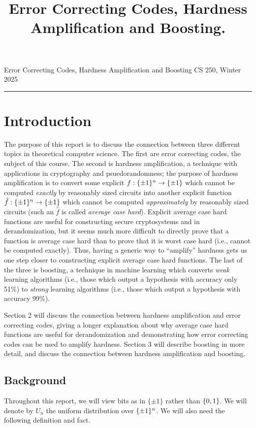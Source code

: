 \documentclass[11pt]{article}
\title{Error Correcting Codes, Hardness Amplification and Boosting.}
\date{}
\begin{document}
    
\noindent Error Correcting Codes, Hardness Amplification and Boosting \hfill  CS 250, Winter 2025\\
\hrule


\section{Introduction}

The purpose of this report is to discuss the connection between three different topics in theoretical computer science. The first are error correcting codes, the subject of this course. The second is hardness amplification, a technique with applications in cryptography and psuedorandomness; the purpose of hardness amplification is to convert some explicit $f : \{\pm 1\}^n \rightarrow \{\pm 1\}$ which cannot be computed \emph{exactly} by reasonably sized circuits into another explicit function $\hat{f} : \{\pm 1\}^n \rightarrow \{\pm 1\}$ which cannot be computed \emph{approximately} by reasonably sized circuits (such an $\hat{f}$ is called \emph{average case hard}). Explicit average case hard functions are useful for constructing secure cryptosystems and in derandomization, but it seems much more difficult to directly prove that a function is average case hard than to prove that it is worst case hard (i.e., cannot be computed exactly). Thus, having a generic way to ``amplify'' hardness gets us one step closer to constructing explicit average case hard functions. The last of the three is boosting, a technique in machine learning which converts \emph{weak} learning algorithms (i.e., those which output a hypothesis with accuracy only 51\%) to \emph{strong} learning algorithms (i.e., those which output a hypothesis with accuracy 99\%).

Section 2 will discuss the connection between hardness amplification and error correcting codes, giving a longer explanation about why average case hard functions are useful for derandomization and demonstrating how error correcting codes can be used to amplify hardness. Section 3 will describe boosting in more detail, and discuss the connection between hardness amplification and boosting.

\subsection{Background}

Throughout this report, we will view bits as in $\{\pm 1\}$ rather than $\{0, 1\}$. We will denote by $U_n$ the uniform distribution over $\{\pm 1\}^n$. We will also need the following definition and fact.
\end{document}
